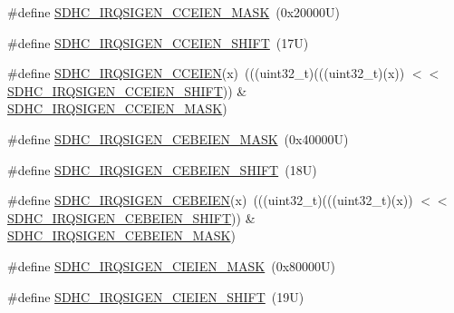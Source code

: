\begin{DoxyCompactItemize}
\item 
\#define \mbox{\hyperlink{group___s_d_h_c___register___masks_ga3d875f5185d1fb805a87aa0c0737ded7}{S\+D\+H\+C\+\_\+\+I\+R\+Q\+S\+I\+G\+E\+N\+\_\+\+C\+C\+E\+I\+E\+N\+\_\+\+M\+A\+SK}}~(0x20000\+U)
\item 
\#define \mbox{\hyperlink{group___s_d_h_c___register___masks_ga2bc72b9a24dfa8dbae34157775b493c7}{S\+D\+H\+C\+\_\+\+I\+R\+Q\+S\+I\+G\+E\+N\+\_\+\+C\+C\+E\+I\+E\+N\+\_\+\+S\+H\+I\+FT}}~(17\+U)
\item 
\#define \mbox{\hyperlink{group___s_d_h_c___register___masks_gae810282bb271e138b59762f975c9483c}{S\+D\+H\+C\+\_\+\+I\+R\+Q\+S\+I\+G\+E\+N\+\_\+\+C\+C\+E\+I\+EN}}(x)~(((uint32\+\_\+t)(((uint32\+\_\+t)(x)) $<$$<$ \mbox{\hyperlink{group___s_d_h_c___register___masks_ga2bc72b9a24dfa8dbae34157775b493c7}{S\+D\+H\+C\+\_\+\+I\+R\+Q\+S\+I\+G\+E\+N\+\_\+\+C\+C\+E\+I\+E\+N\+\_\+\+S\+H\+I\+FT}})) \& \mbox{\hyperlink{group___s_d_h_c___register___masks_ga3d875f5185d1fb805a87aa0c0737ded7}{S\+D\+H\+C\+\_\+\+I\+R\+Q\+S\+I\+G\+E\+N\+\_\+\+C\+C\+E\+I\+E\+N\+\_\+\+M\+A\+SK}})
\item 
\#define \mbox{\hyperlink{group___s_d_h_c___register___masks_ga200f2b394bdfd0e097f4ad4c496ff2d6}{S\+D\+H\+C\+\_\+\+I\+R\+Q\+S\+I\+G\+E\+N\+\_\+\+C\+E\+B\+E\+I\+E\+N\+\_\+\+M\+A\+SK}}~(0x40000\+U)
\item 
\#define \mbox{\hyperlink{group___s_d_h_c___register___masks_ga1b7ce68e7e1e9354fd70b85ffe1625a1}{S\+D\+H\+C\+\_\+\+I\+R\+Q\+S\+I\+G\+E\+N\+\_\+\+C\+E\+B\+E\+I\+E\+N\+\_\+\+S\+H\+I\+FT}}~(18\+U)
\item 
\#define \mbox{\hyperlink{group___s_d_h_c___register___masks_gaef881727740e440cc330f809f77fbf01}{S\+D\+H\+C\+\_\+\+I\+R\+Q\+S\+I\+G\+E\+N\+\_\+\+C\+E\+B\+E\+I\+EN}}(x)~(((uint32\+\_\+t)(((uint32\+\_\+t)(x)) $<$$<$ \mbox{\hyperlink{group___s_d_h_c___register___masks_ga1b7ce68e7e1e9354fd70b85ffe1625a1}{S\+D\+H\+C\+\_\+\+I\+R\+Q\+S\+I\+G\+E\+N\+\_\+\+C\+E\+B\+E\+I\+E\+N\+\_\+\+S\+H\+I\+FT}})) \& \mbox{\hyperlink{group___s_d_h_c___register___masks_ga200f2b394bdfd0e097f4ad4c496ff2d6}{S\+D\+H\+C\+\_\+\+I\+R\+Q\+S\+I\+G\+E\+N\+\_\+\+C\+E\+B\+E\+I\+E\+N\+\_\+\+M\+A\+SK}})
\item 
\#define \mbox{\hyperlink{group___s_d_h_c___register___masks_ga3a09f7cd7b41c260dd89ea77a1511005}{S\+D\+H\+C\+\_\+\+I\+R\+Q\+S\+I\+G\+E\+N\+\_\+\+C\+I\+E\+I\+E\+N\+\_\+\+M\+A\+SK}}~(0x80000\+U)
\item 
\#define \mbox{\hyperlink{group___s_d_h_c___register___masks_gae0d92453706b49294eac23eb53e2c742}{S\+D\+H\+C\+\_\+\+I\+R\+Q\+S\+I\+G\+E\+N\+\_\+\+C\+I\+E\+I\+E\+N\+\_\+\+S\+H\+I\+FT}}~(19\+U)

\end{DoxyCompactItemize}
